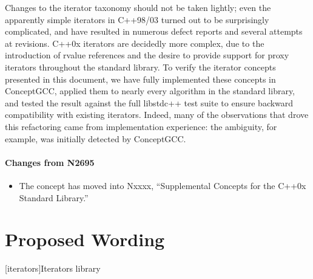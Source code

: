 \documentclass[american,twoside]{book}
\begin{document}
\begin{titlepage}
Changes to the iterator taxonomy should not be taken lightly; even the
apparently simple iterators in C++98/03 turned out to be surprisingly
complicated, and have resulted in numerous defect reports and several
attempts at revisions. C++0x iterators are decidedly more complex, due
to the introduction of rvalue references and the desire to provide
support for proxy iterators throughout the standard library. To verify
the iterator concepts presented in this document, we have fully
implemented these concepts in ConceptGCC, applied them to nearly every
algorithm in the standard library, and tested the result against the
full libstdc++ test suite to ensure backward compatibility with
existing iterators. Indeed, many of the observations that drove this
refactoring came from implementation experience: the 
ambiguity, for example, was initially detected by ConceptGCC. 

\paragraph*{Changes from N2695}
\begin{itemize}
\item The  concept has moved into Nxxxx, ``Supplemental Concepts for the C++0x Standard Library.''
\end{itemize}


\end{titlepage}

\section*{Proposed Wording}

\pagestyle{fancy}
\fancyhead[LE,RO]{\textbf{\rightmark}}
\fancyhead[RE]{\textbf{\leftmark\hspace{1em}\thepage}}
\fancyhead[LO]{\textbf{\thepage\hspace{1em}\leftmark}}


\renewcommand{\sectionmark}[1]{\markright{\thesection\hspace{1em}#1}}
\renewcommand{\chaptermark}[1]{\markboth{#1}{}}

\setcounter{chapter}{23}
[iterators]{Iterators library}
\end{document}
